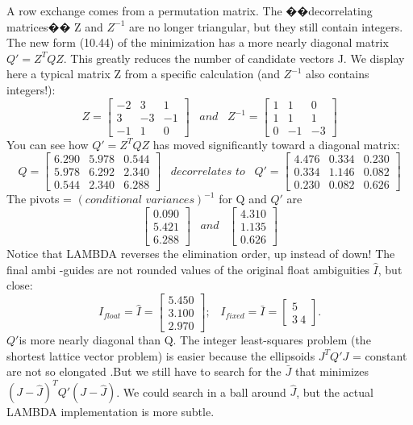 A row exchange comes from a permutation matrix. The ��decorrelating matrices�� Z and $Z^{-1}$ are no longer triangular, but they still contain integers. The new form (10.44) of the minimization has a more nearly diagonal matrix $Q'=Z^{T}QZ$. This greatly reduces the number of candidate vectors J. We display here a typical matrix Z from a specific calculation (and $Z^{-1}$ also contains integers!):
$$
Z=
\begin{bmatrix}
-2&3&1\\
3&-3&-1\\
-1&1&0
\end{bmatrix}\,\,\,\,\,
and\,\,\,\,\,
Z^{-1}=
\begin{bmatrix}
1&1&0\\
1&1&1\\
0&-1&-3
\end{bmatrix}
$$
You can see how $Q'=Z^{T}QZ$ has moved significantly toward a diagonal matrix:
$$
Q=
\begin{bmatrix}
6.290&5.978&0.544\\
5.978&6.292&2.340\\
0.544&2.340&6.288
\end{bmatrix}\,\,\,\,\,decorrelates\,\,to\,\,\,\,\,
Q'=
\begin{bmatrix}
4.476&0.334&0.230\\
0.334&1.146&0.082\\
0.230&0.082&0.626
\end{bmatrix}
$$
The pivots = $(conditional\,\, variances)^{-1}$ for Q and $Q'$ are
$$
\begin{bmatrix}
0.090\\
5.421\\
6.288
\end{bmatrix}\,\,\,\,\,and\,\,\,\,\,
\begin{bmatrix}
4.310\\
1.135\\
0.626
\end{bmatrix}
$$
Notice that LAMBDA reverses the elimination order, up instead of down! The final ambi  -guides are not rounded values of the original float ambiguities $\hat{I}$, but close:
$$
I_{float}=\hat{I}=
\begin{bmatrix}
5.450\\
3.100\\
2.970
\end{bmatrix};\,\,\,\,\,
I_{fixed}=\bar{I}=\begin{bmatrix}
5\\
3\
4
\end{bmatrix}.
$$
$Q'$is more nearly diagonal than Q. The integer least-squares problem (the shortest lattice vector problem) is easier because the ellipsoids $J^{T}Q'J$ = constant are not so elongated .But we still have to search for the $\bar{J}$ that minimizes $(J-\hat{J})^{T}Q'(J-\hat{J})$. We could search in a ball around $\hat{J}$, but the actual LAMBDA implementation is more subtle.


